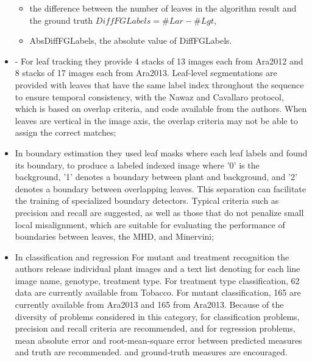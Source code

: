 \begin{itemize}
\begin{itemize}
\item the difference between the number of leaves in the algorithm result and the ground truth $DiffFGLabels = \#Lar - \#Lgt$,
\item AbsDiffFGLabels, the absolute value of DiffFGLabels.
\end{itemize}
\item - For leaf tracking they provide 4 stacks of 13 images each from Ara2012 and 8 stacks of 17 images each from Ara2013. Leaf-level segmentations are provided
with leaves that have the same label index throughout the sequence to ensure temporal consistency, with the Nawaz and Cavallaro protocol, which is based on overlap
criteria, and code available from the authors. When leaves are vertical in the image axis, the overlap criteria may not be able to assign the correct matches;
\item In boundary estimation they used leaf masks where each leaf labels and found its boundary, to produce a labeled indexed image where '0' is the background,
'1' denotes a boundary between plant and background, and '2' denotes a boundary between overlapping leaves. This separation can facilitate the training of specialized
boundary detectors. Typical criteria such as precision and recall are suggested, as well as those that do not penalize small local misalignment, which are suitable for
evaluating the performance of boundaries between leaves, the MHD, and Minervini;
\item In classification and regression For mutant and treatment recognition the authors release individual plant images and a text list denoting for each line image name,
genotype, treatment type. For treatment type classification, 62 data are currently available from Tobacco. For mutant classification, 165 are currently available
from Ara2013 and 165 from Ara2013. Because of the diversity of problems considered in this category, for classification problems, precision and recall criteria are
recommended, and for regression problems, mean absolute error and root-mean-square error between predicted measures and truth are recommended. and ground-truth measures
are encouraged.
\end{itemize}










